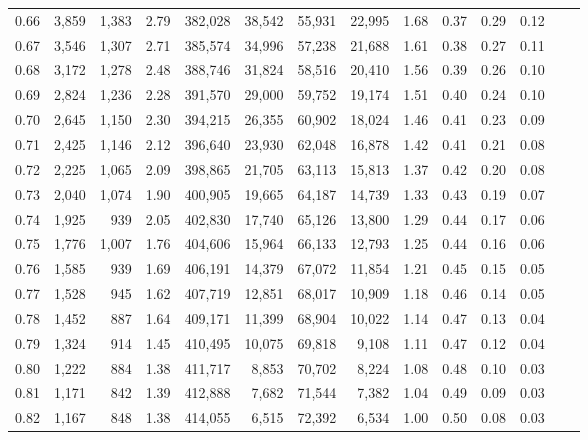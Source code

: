 \begin{tabular}{rrrrrrrrrrrrrr}
0.66 &   3,859 &  1,383 &    2.79 &  382,028 &   38,542 &  55,931 &  22,995 &  1.68 &  0.37 &  0.29 &      0.12 \\
0.67 &   3,546 &  1,307 &    2.71 &  385,574 &   34,996 &  57,238 &  21,688 &  1.61 &  0.38 &  0.27 &      0.11 \\
0.68 &   3,172 &  1,278 &    2.48 &  388,746 &   31,824 &  58,516 &  20,410 &  1.56 &  0.39 &  0.26 &      0.10 \\
0.69 &   2,824 &  1,236 &    2.28 &  391,570 &   29,000 &  59,752 &  19,174 &  1.51 &  0.40 &  0.24 &      0.10 \\
0.70 &   2,645 &  1,150 &    2.30 &  394,215 &   26,355 &  60,902 &  18,024 &  1.46 &  0.41 &  0.23 &      0.09 \\
0.71 &   2,425 &  1,146 &    2.12 &  396,640 &   23,930 &  62,048 &  16,878 &  1.42 &  0.41 &  0.21 &      0.08 \\
0.72 &   2,225 &  1,065 &    2.09 &  398,865 &   21,705 &  63,113 &  15,813 &  1.37 &  0.42 &  0.20 &      0.08 \\
0.73 &   2,040 &  1,074 &    1.90 &  400,905 &   19,665 &  64,187 &  14,739 &  1.33 &  0.43 &  0.19 &      0.07 \\
0.74 &   1,925 &    939 &    2.05 &  402,830 &   17,740 &  65,126 &  13,800 &  1.29 &  0.44 &  0.17 &      0.06 \\
0.75 &   1,776 &  1,007 &    1.76 &  404,606 &   15,964 &  66,133 &  12,793 &  1.25 &  0.44 &  0.16 &      0.06 \\
0.76 &   1,585 &    939 &    1.69 &  406,191 &   14,379 &  67,072 &  11,854 &  1.21 &  0.45 &  0.15 &      0.05 \\
0.77 &   1,528 &    945 &    1.62 &  407,719 &   12,851 &  68,017 &  10,909 &  1.18 &  0.46 &  0.14 &      0.05 \\
0.78 &   1,452 &    887 &    1.64 &  409,171 &   11,399 &  68,904 &  10,022 &  1.14 &  0.47 &  0.13 &      0.04 \\
0.79 &   1,324 &    914 &    1.45 &  410,495 &   10,075 &  69,818 &   9,108 &  1.11 &  0.47 &  0.12 &      0.04 \\
0.80 &   1,222 &    884 &    1.38 &  411,717 &    8,853 &  70,702 &   8,224 &  1.08 &  0.48 &  0.10 &      0.03 \\
0.81 &   1,171 &    842 &    1.39 &  412,888 &    7,682 &  71,544 &   7,382 &  1.04 &  0.49 &  0.09 &      0.03 \\
0.82 &   1,167 &    848 &    1.38 &  414,055 &    6,515 &  72,392 &   6,534 &  1.00 &  0.50 &  0.08 &      0.03 \\

\end{tabular}
